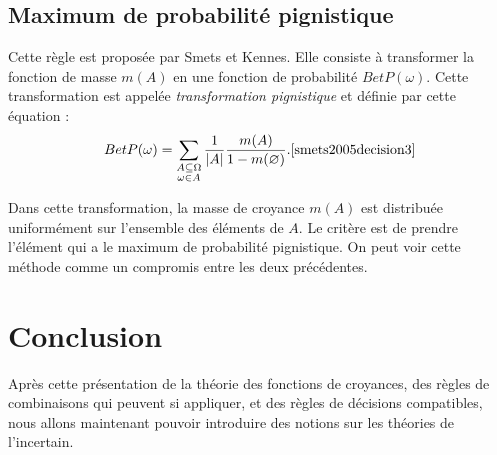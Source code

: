 \subsection{Maximum de probabilité pignistique}

Cette règle est proposée par Smets et Kennes. Elle consiste à transformer la fonction
de masse $m(A)$ en une fonction de probabilité $BetP(\omega)$. Cette transformation
est appelée \emph{transformation pignistique} et définie par cette équation :
\begin{equation}
BetP(\omega) = \sum_{\substack{A \subseteq \Omega \\
\omega \in A}} \frac{1}{|A|}  \frac{m(A)}{1-m(\varnothing)}. \cite{smets2005decision3}
\end{equation}

Dans cette transformation, la masse de croyance $m(A)$ est distribuée uniformément
sur l’ensemble des éléments de $A$. Le critère est de prendre l'élément qui a le
maximum de probabilité pignistique. On peut voir cette méthode comme un compromis
entre les deux précédentes.

{}
\section*{Conclusion}

Après cette présentation de la théorie des fonctions de
croyances, des règles de combinaisons qui peuvent si appliquer,
et des règles de décisions compatibles, nous allons maintenant pouvoir introduire
des notions sur les théories de l'incertain.